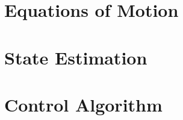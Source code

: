 \documentclass[12pt,twoside]{report}
\begin{document}
\chapter{Equations of Motion}\label{chap:EQN}


\chapter{State Estimation}


\chapter{Control Algorithm}






\clearpage

%
\end{document}
